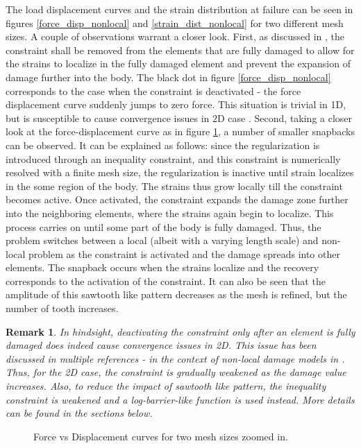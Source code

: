 \documentclass[12pt]{elsarticle}
\newtheorem*{remark}{Remark}
\begin{document}
The load displacement curves and the strain distribution at failure can be seen in figures \ref{force_disp_nonlocal} and \ref{strain_dist_nonlocal} for two different mesh sizes. A couple of observations warrant a closer look. First, as discussed in \cite{Kamasamudram2023s}, the constraint shall be removed from the elements that are fully damaged to allow for the strains to localize in the fully damaged element and prevent the expansion of damage further into the body. The black dot in figure \ref{force_disp_nonlocal} corresponds to the case when the constraint is deactivated - the force displacement curve suddenly jumps to zero force. This situation is trivial in 1D, but is susceptible to cause convergence issues in 2D case \cite{geersarticle}. Second, taking a closer look at the force-displacement curve as in figure \ref{force_disp_nonlocal_zoom}, a number of smaller snapbacks can be observed. It can be explained as follows: since the regularization is introduced through an inequality constraint, and this constraint is numerically resolved with a finite mesh size, the regularization is inactive until strain localizes in the some region of the body. The strains thus grow locally till the constraint becomes active. Once activated, the constraint expands the damage zone further into the neighboring elements, where the strains again begin to localize. This process carries on until some part of the body is fully damaged. Thus, the problem switches between a local (albeit with a varying length scale) and non-local problem as the constraint is activated and the damage spreads into other elements. The snapback occurs when the strains localize and the recovery corresponds to the activation of the constraint. It can also be seen that the amplitude of this sawtooth like pattern decreases as the mesh is refined, but the number of tooth increases.


\begin{remark}
	In hindsight, deactivating the constraint only after an element is fully damaged does indeed cause convergence issues in 2D. This issue has been discussed in multiple references - in the context of non-local damage models in \cite{Geers1998}. Thus, for the 2D case, the constraint is gradually weakened as the damage value increases. Also, to reduce the impact of sawtooth like pattern, the inequality constraint is weakened and a log-barrier-like function is used instead. More details can be found in the sections below.
\end{remark}


\begin{figure}[ht]
	\centering
	
	\caption{Force vs Displacement curves for two mesh sizes zoomed in.}
	\label{force_disp_nonlocal_zoom}
\end{figure}
\end{document}
